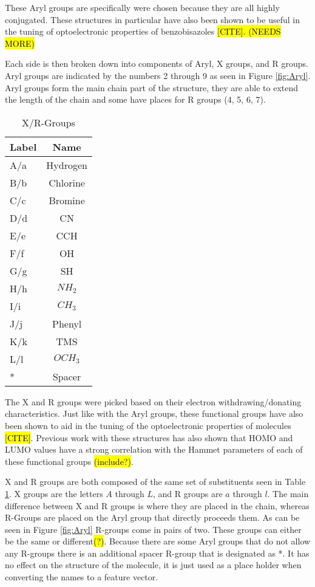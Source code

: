 \documentclass[10pt]{article}
\begin{document}
These Aryl groups are specifically were chosen because they are all highly conjugated. These structures in particular have also been shown to be useful in the tuning of optoelectronic properties of benzobisazoles \hl{[CITE]. (NEEDS MORE)}

Each side is then broken down into components of Aryl, X groups, and R groups. Aryl groups are indicated by the numbers 2 through 9 as seen in Figure \ref{fig:Aryl}. Aryl groups form the main chain part of the structure, they are able to extend the length of the chain and some have places for R groups (4, 5, 6, 7).

\begin{table}[H]
  \centering
  \caption{X/R-Groups}
  \begin{tabular}{lc}
    Label   & Name      \\
    \hline
    A/a     & Hydrogen  \\
    B/b     & Chlorine  \\
    C/c     & Bromine   \\
    D/d     & CN        \\
    E/e     & CCH       \\
    F/f     & OH        \\
    G/g     & SH        \\
    H/h     & $NH_2$    \\
    I/i     & $CH_3$    \\
    J/j     & Phenyl    \\
    K/k     & TMS       \\
    L/l     & $OCH_3$   \\
    *       & Spacer    \\
    \hline
  \end{tabular}
  \label{tab:xrgroups}
\end{table}

The X and R groups were picked based on their electron withdrawing/donating characteristics. Just like with the Aryl groups, these functional groups have also been shown to aid in the tuning of the optoelectronic properties of molecules \hl{[CITE]}. Previous work with these structures has also shown that HOMO and LUMO values have a strong correlation with the Hammet parameters of each of these functional groups \hl{(include?)}.


X and R groups are both composed of the same set of substituents seen in Table \ref{tab:xrgroups}. X groups are the letters $A$ through $L$, and R groups are $a$ through $l$. The main difference between X and R groups is where they are placed in the chain, whereas R-Groups are placed on the Aryl group that directly proceeds them. As can be seen in Figure \ref{fig:Aryl} R-groups come in pairs of two. These groups can either be the same or different\hl{(?)}. Because there are some Aryl groups that do not allow any R-groups there is an additional spacer R-group that is designated as *. It has no effect on the structure of the molecule, it is just used as a place holder when converting the names to a feature vector.
\end{document}
